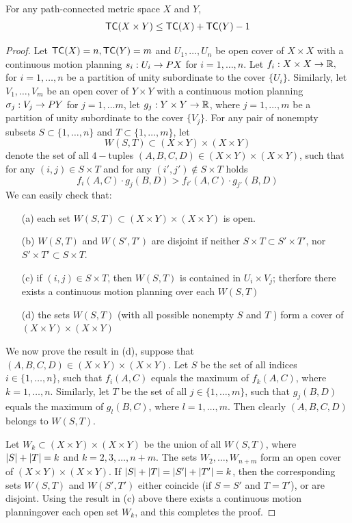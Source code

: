 \begin{thm}
    For any path-connected metric space $X$ and $Y$,
    \[
        \textsf{TC}(X \times Y) \le \textsf{TC}(X) + \textsf{TC}(Y) - 1
    \]
\end{thm}

\begin{proof}
    Let $\textsf{TC}(X) = n, \textsf{TC}(Y) = m$ and $U_1, \ldots, U_n$ be open cover of $X \times X$ with a continuous motion planning $s_i : U_i \rightarrow PX$ for $i = 1, \ldots, n$. Let $f_i : X \times X \rightarrow \mathbb{R},$ for $i = 1, \ldots, n$ be a partition of unity subordinate to the cover $\{U_i\}$. Similarly, let $V_1, \ldots,V_m$ be an open cover of $Y \times Y$ with a continuous motion planning $\sigma_j : V_j \rightarrow PY$ for $j = 1, \ldots m$, let $g_j : Y \times Y \rightarrow \mathbb{R}$, where $j = 1, \ldots, m$ be a partition of unity subordinate to the cover $\{V_j\}$. For any pair of nonempty subsets $S \subset \{1, \ldots, n\}$ and $T \subset \{1, \ldots, m\}$, let
    \[
        W(S,T) \subset (X \times Y) \times (X \times Y)
    \]
    denote the set of all $4-$tuples $(A,B,C,D) \in (X \times Y) \times (X \times Y)$, such that for any $(i,j) \in S \times T$ and for any $(i', j') \notin S \times T$ holds
    \[
        f_i(A,C) \cdot g_j(B, D) > f_{i'}(A,C) \cdot g_{j'} (B, D)
    \]
    We can easily check that:
    \begin{itemize}
        \item[(a)] each set $W(S,T) \subset (X \times Y) \times (X \times Y)$ is open.
        \item[(b)] $W(S,T)$ and $W(S', T')$ are disjoint if neither $S \times T \subset S' \times T'$, nor $S' \times T' \subset S \times T$.
        \item[(c)] if $(i,j) \in S \times T$, then $W(S,T)$ is contained in $U_i \times V_j$; therfore there exists a continuous motion planning over each $W(S,T)$
        \item[(d)]  the sets $W(S,T)$ (with all possible nonempty $S$ and $T$ ) form a cover of $(X \times Y) \times (X \times Y)$
    \end{itemize}
    We now prove the result in (d), suppose that $(A,B,C,D) \in (X \times Y) \times (X \times Y)$. Let $S$ be the set of all indices $i \in \{1, \ldots, n\}$, such that $f_i(A,C)$ equals the maximum of $f_k(A,C)$, where $k = 1, \ldots, n$. Similarly, let $T$ be the set of all $j \in \{1, \ldots, m\}$, such that $g_j(B,D)$ equals the maximum of $g_l(B,C)$, where $l = 1, \ldots, m$. Then clearly $(A,B,C,D)$ belongs to $W(S,T)$.

    Let $W_k \subset (X \times Y) \times (X \times Y)$ be the union of all $W(S,T)$, where $\lvert S\rvert + \lvert T\rvert = k$ and $k = 2,3, \ldots, n+m$. The sets $W_2, \ldots, W_{n+m}$ form an open cover of $(X \times Y) \times (X \times Y)$. If $\lvert S\rvert + \lvert T\rvert = \lvert S'\rvert + \lvert T'\rvert = k$, then the corresponding sets $W(S,T)$ and $W(S', T')$ either coincide (if $S = S'$ and $T = T'$), or are disjoint. Using the result in (c) above there exists a continuous motion planningover each open set $W_k$, and this completes the proof.
\end{proof}

